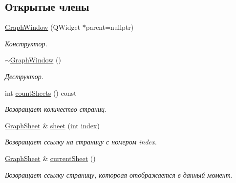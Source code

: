 \subsection*{Открытые члены}
\begin{DoxyCompactItemize}
\item 
\hypertarget{class_graph_window_a68f193cacc0237a41d8c44923b53c11a}{}\label{class_graph_window_a68f193cacc0237a41d8c44923b53c11a} 
\hyperlink{class_graph_window_a68f193cacc0237a41d8c44923b53c11a}{Graph\+Window} (Q\+Widget $\ast$parent=nullptr)
\begin{DoxyCompactList}\small\item\em Конструктор. \end{DoxyCompactList}\item 
\hypertarget{class_graph_window_acca1dc8c3eefe6608ae2de3cee2e22ee}{}\label{class_graph_window_acca1dc8c3eefe6608ae2de3cee2e22ee} 
\hyperlink{class_graph_window_acca1dc8c3eefe6608ae2de3cee2e22ee}{$\sim$\+Graph\+Window} ()
\begin{DoxyCompactList}\small\item\em Деструктор. \end{DoxyCompactList}\item 
\hypertarget{class_graph_window_ab98c88684db794aa596c3af2dfe79b18}{}\label{class_graph_window_ab98c88684db794aa596c3af2dfe79b18} 
int \hyperlink{class_graph_window_ab98c88684db794aa596c3af2dfe79b18}{count\+Sheets} () const
\begin{DoxyCompactList}\small\item\em Возвращает количество страниц. \end{DoxyCompactList}\item 
\hypertarget{class_graph_window_a756c68dacb48b03ac45d457d61a760d8}{}\label{class_graph_window_a756c68dacb48b03ac45d457d61a760d8} 
\hyperlink{class_graph_sheet}{Graph\+Sheet} \& \hyperlink{class_graph_window_a756c68dacb48b03ac45d457d61a760d8}{sheet} (int index)
\begin{DoxyCompactList}\small\item\em Возвращает ссылку на страницу с номером index. \end{DoxyCompactList}\item 
\hypertarget{class_graph_window_a1e2ba902888b95d5fef9dfe081bac90b}{}\label{class_graph_window_a1e2ba902888b95d5fef9dfe081bac90b} 
\hyperlink{class_graph_sheet}{Graph\+Sheet} \& \hyperlink{class_graph_window_a1e2ba902888b95d5fef9dfe081bac90b}{current\+Sheet} ()
\begin{DoxyCompactList}\small\item\em Возвращает ссылку страницу, котороая отображается в данный момент. \end{DoxyCompactList}\item 

\end{DoxyCompactItemize}

